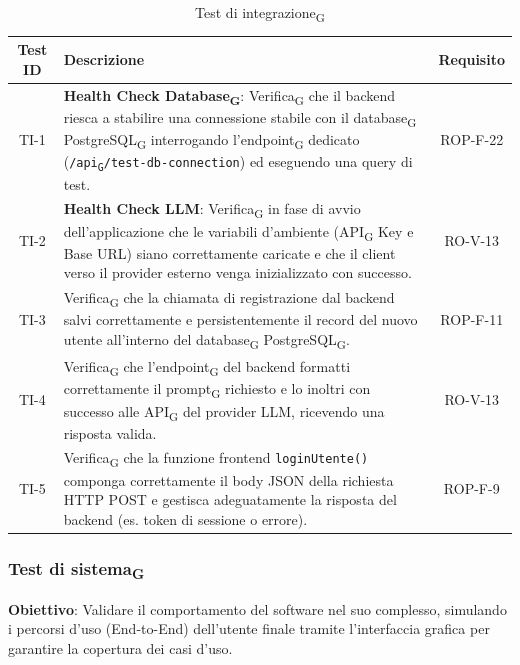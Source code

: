 \documentclass[11pt,a4paper]{article}
\newcommand{\gls}[1]{#1\textsubscript{G}}
\begin{document}
\begin{table}[H]
    \centering
    \small
    \begin{tabularx}{\textwidth}{|c|X|c|}
        \hline
        \textbf{Test ID} & \textbf{Descrizione} & \textbf{Requisito} \\
        \hline
        TI-1 & \textbf{Health Check \gls{Database}}: \gls{Verifica} che il backend riesca a stabilire una connessione stabile con il \gls{database} \gls{PostgreSQL} interrogando l'\gls{endpoint} dedicato (\texttt{/\gls{api}/test-db-connection}) ed eseguendo una query di test. & ROP-F-22 \\
        \hline
        TI-2 & \textbf{Health Check LLM}: \gls{Verifica} in fase di avvio dell'applicazione che le variabili d'ambiente (\gls{API} Key e Base URL) siano correttamente caricate e che il client verso il provider esterno venga inizializzato con successo. & RO-V-13 \\
        \hline
        TI-3 & \gls{Verifica} che la chiamata di registrazione dal backend salvi correttamente e persistentemente il record del nuovo utente all'interno del \gls{database} \gls{PostgreSQL}. & ROP-F-11 \\
        \hline
        TI-4 & \gls{Verifica} che l'\gls{endpoint} del backend formatti correttamente il \gls{prompt} richiesto e lo inoltri con successo alle \gls{API} del provider LLM, ricevendo una risposta valida. & RO-V-13 \\
        \hline
        TI-5 & \gls{Verifica} che la funzione frontend \texttt{loginUtente()} componga correttamente il body JSON della richiesta HTTP POST e gestisca adeguatamente la risposta del backend (es. token di sessione o errore). & ROP-F-9 \\
        \hline
    \end{tabularx}
    \caption{\gls{Test di integrazione}}
\end{table}

\subsubsection{\gls{Test di sistema}}
\textbf{Obiettivo}: Validare il comportamento del software nel suo complesso, simulando i percorsi d'uso (End-to-End) dell'utente finale tramite l'interfaccia grafica per garantire la copertura dei casi d'uso.
\end{document}
